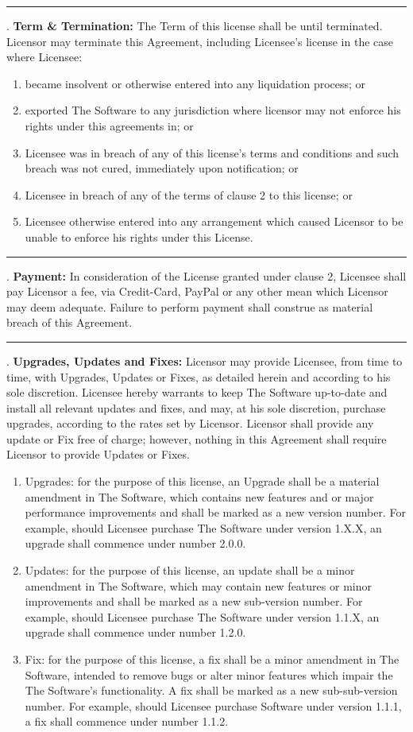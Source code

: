 \documentclass[oneside,openany,11pt,a4paper]{report}
\begin{document}
\noindent\rule{\textwidth}{0.5pt}
. \textbf{Term \& Termination:} The Term of this license shall be until terminated. Licensor may terminate this Agreement, including Licensee’s license in the case where Licensee:
\begin{enumerate}
	\item became insolvent or otherwise entered into any liquidation process; or
\item exported The Software to any jurisdiction where licensor may not enforce his rights under this agreements in; or
\item Licensee was in breach of any of this license's terms and conditions and such breach was not cured, immediately upon notification; or
\item Licensee in breach of any of the terms of clause 2 to this license; or
\item Licensee otherwise entered into any arrangement which caused Licensor to be unable to enforce his rights under this License.
\end{enumerate}

\noindent\rule{\textwidth}{0.5pt}
. \textbf{Payment:} In consideration of the License granted under clause 2, Licensee shall pay Licensor a fee, via Credit-Card, PayPal or any other mean which Licensor may deem adequate. Failure to perform payment shall construe as material breach of this Agreement.

\noindent\rule{\textwidth}{0.5pt}
. \textbf{Upgrades, Updates and Fixes:} Licensor may provide Licensee, from time to time, with Upgrades, Updates or Fixes, as detailed herein and according to his sole discretion. Licensee hereby warrants to keep The Software up-to-date and install all relevant updates and fixes, and may, at his sole discretion, purchase upgrades, according to the rates set by Licensor. Licensor shall provide any update or Fix free of charge; however, nothing in this Agreement shall require Licensor to provide Updates or Fixes.
\begin{enumerate} 
	\item Upgrades: for the purpose of this license, an Upgrade shall be a material amendment in The Software, which contains new features and or major performance improvements and shall be marked as a new version number. For example, should Licensee purchase The Software under version 1.X.X, an upgrade shall commence under number 2.0.0.

\item Updates: for the purpose of this license, an update shall be a minor amendment in The Software, which may contain new features or minor improvements and shall be marked as a new sub-version number. For example, should Licensee purchase The Software under version 1.1.X, an upgrade shall commence under number 1.2.0.
\item Fix: for the purpose of this license, a fix shall be a minor amendment in The Software, intended to remove bugs or alter minor features which impair the The Software's functionality. A fix shall be marked as a new sub-sub-version number. For example, should Licensee purchase Software under version 1.1.1, a fix shall commence under number 1.1.2.
\end{enumerate}
\end{document}
